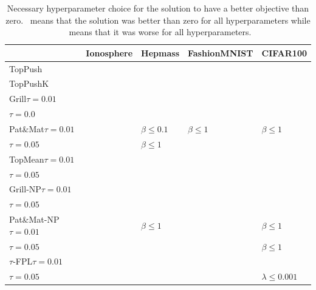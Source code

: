 \documentclass[]{interact}
\theoremstyle{plain}%
\theoremstyle{definition}
\theoremstyle{remark}
\newcommand{\cmark}{{\color{mygreen} \ding{51}}}%
\newcommand{\xmark}{{\color{myred} \ding{55}}}
\newcommand{\atoppush}{TopPush\xspace}
\newcommand{\atoppushk}{TopPushK\xspace}
\newcommand{\agrill}{Grill\xspace}
\newcommand{\apatmat}{Pat\&Mat\xspace}
\newcommand{\atopmeank}{TopMean\xspace}
\newcommand{\anpA}{Grill-NP\xspace}
\newcommand{\anpB}{Pat\&Mat-NP\xspace}
\newcommand{\anpC}{$\tau$-FPL\xspace}
\begin{document}
\begin{table}[!ht]
\caption{Necessary hyperparameter choice for the solution to have a better objective than zero. \cmark\ means that the solution was better than zero for all hyperparameters while \xmark\ means that it was worse for all hyperparameters.}
\label{tab:fails}
\centering
\begin{tabular}{@{}lllll@{}}
\toprule
 & Ionosphere & Hepmass & FashionMNIST & CIFAR100 \\
\midrule
\atoppush						& \cmark 	&\xmark	&\cmark	&\xmark          \\
\atoppushk 						& \cmark	&\xmark	&\cmark	&\xmark                      \\
\agrill$\tau=0.01$ 				& \xmark	&\xmark	& \xmark	&\xmark              \\
\phantom{\agrill}$\tau=0.0$     & \xmark	&\xmark	& \xmark	&\xmark              \\
\apatmat$\tau=0.01$				& \cmark	&{\color{mygreen} \boldmath$\beta\le 0.1$}	&{\color{mygreen} \boldmath$\beta\le 1$}	&{\color{mygreen} \boldmath$\beta\le 1$}  \\
\phantom{\apatmat}$\tau=0.05$ 	& \cmark	&{\color{mygreen} \boldmath$\beta\le 1$}	&\cmark	& \cmark 			\\
\atopmeank$\tau=0.01$ 			& \xmark	&\xmark	&\xmark	&\xmark                      \\
\phantom{\atopmeank}$\tau=0.05$ & \xmark	&\xmark	&\xmark	&\xmark                      \\
\anpA$\tau=0.01$				& \xmark	&\xmark	&\xmark	&\xmark              \\
\phantom{\anpA}$\tau=0.05$ 		& \xmark	&\xmark	&\xmark	&\xmark                      \\
\anpB$\tau=0.01$ 				& \cmark	&{\color{mygreen} \boldmath$\beta\le 1$}	&\cmark	&{\color{mygreen} \boldmath$\beta\le 1$}        \\
\phantom{\anpB}$\tau=0.05$		& \cmark	&\cmark	&\cmark	&{\color{mygreen} \boldmath$\beta\le 1$}              \\
\anpC$\tau=0.01$ 				& \cmark	&\xmark	&\cmark	&\xmark                      \\
\phantom{\anpC}$\tau=0.05$		& \cmark	&\cmark	&\cmark	&{\color{mygreen} \boldmath$\lambda\le 0.001$}                      \\
\bottomrule
\end{tabular}
\end{table}
\end{document}

